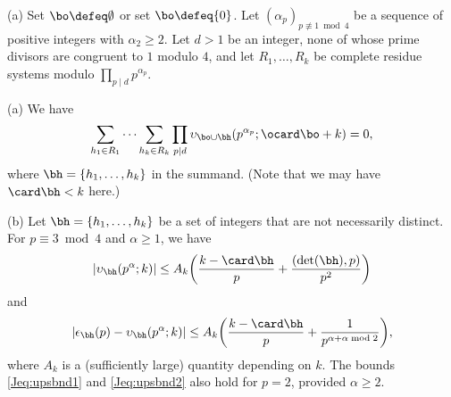 \documentclass[12pt, reqno, twoside, letterpaper]{amsart}
\begin{document}
\begin{jetsam}
\begin{lemma}
 \label{Jlem:cancel}
%
\textup{(}a\textup{)}
%
Set $\bo \defeq \emptyset$ or set $\bo \defeq \{0\}$.
%
Let $(\alpha_p)_{p \not\equiv 1 \bmod 4}$ be a sequence of 
positive integers with $\alpha_2 \ge 2$.
%
Let $d > 1$ be an integer, none of whose prime divisors 
are congruent to $1$ modulo $4$, and let $R_1,\ldots,R_k$ be 
complete residue systems modulo $\prod_{p \mid d} p^{\alpha_p}$.

\textup{(}a\textup{)}
We have 
\[
 \sum_{h_1 \in R_1} 
  \cdots 
   \sum_{h_k \in R_k}
    \prod_{p \mid d} \upsilon_{\bo \cup \bh}(p^{\alpha_p};\ocard \bo + k)
      =
       0,
\]
where $\bh = \{h_1,\ldots,h_k\}$ in the summand. 
%
\textup{(}Note that we may have $\card \bh < k$ here.\textup{)}

\textup{(}b\textup{)}
%
Let $\bh = \{h_1,\ldots,h_k\}$ be a set of integers that are not 
necessarily distinct.
%
For $p \equiv 3 \bmod 4$ and $\alpha \ge 1$, we have
\begin{equation}
 \label{Jeq:upsbnd1}
 |\upsilon_{\bh}(p^{\alpha};k)|
  \le 
   A_k
    \bigg(
     \frac{k - \card \bh}{p}
      + \frac{(\det(\bh),p)}{p^2}
    \bigg) 
\end{equation}
and 
\begin{equation}
 \label{Jeq:upsbnd2}
 |\epsilon_{\bh}(p) - \upsilon_{\bh}(p^{\alpha};k)|
  \le 
   A_k\bigg(\frac{k - \card \bh}{p} + \frac{1}{p^{\alpha + \alpha \bmod 2}}\bigg),
\end{equation}
where $A_k$ is a \textup{(}sufficiently large\textup{)} quantity 
depending on $k$.
%
The bounds \eqref{Jeq:upsbnd1} and \eqref{Jeq:upsbnd2} also hold for 
$p = 2$, provided $\alpha \ge 2$.
\end{lemma}


\end{jetsam}
\end{document}
